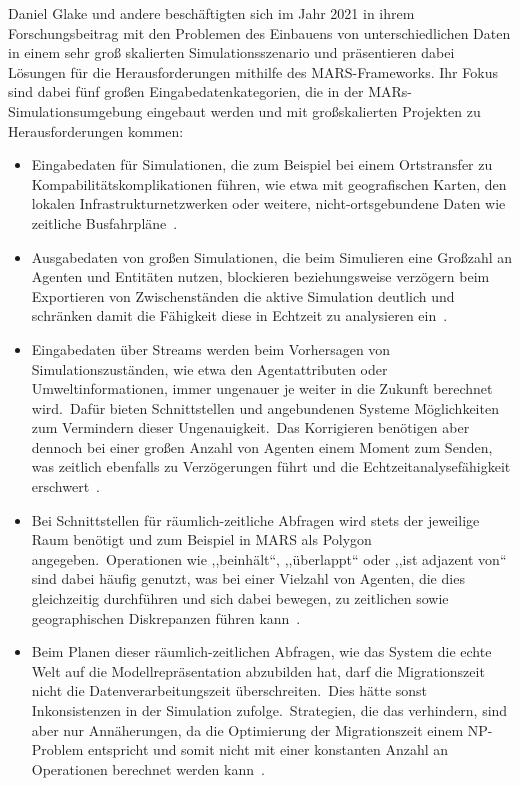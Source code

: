 Daniel Glake und andere beschäftigten sich im Jahr 2021 in ihrem Forschungsbeitrag mit den Problemen des Einbauens von unterschiedlichen Daten in einem sehr groß skalierten Simulationsszenario und präsentieren dabei Lösungen für die Herausforderungen mithilfe des MARS-Frameworks.
Ihr Fokus sind dabei fünf großen Eingabedatenkategorien, die in der MARs-Simulationsumgebung eingebaut werden und mit großskalierten Projekten zu Herausforderungen kommen:
\begin{itemize}
    \item Eingabedaten für Simulationen, die zum Beispiel bei einem Ortstransfer zu Kompabilitätskomplikationen führen, wie etwa mit geografischen Karten, den lokalen Infrastrukturnetzwerken oder weitere, nicht-ortsgebundene Daten wie zeitliche Busfahrpläne~\cite{Glake2021}.
    \item Ausgabedaten von großen Simulationen, die beim Simulieren eine Großzahl an Agenten und Entitäten nutzen, blockieren beziehungsweise verzögern beim Exportieren von Zwischenständen die aktive Simulation deutlich und schränken damit die Fähigkeit diese in Echtzeit zu analysieren ein~\cite{Glake2021}.
    \item Eingabedaten über Streams werden beim Vorhersagen von Simulationszuständen, wie etwa den Agentattributen oder Umweltinformationen, immer ungenauer je weiter in die Zukunft berechnet wird.~Dafür bieten Schnittstellen und angebundenen Systeme Möglichkeiten zum Vermindern dieser Ungenauigkeit.~Das Korrigieren benötigen aber dennoch bei einer großen Anzahl von Agenten einem Moment zum Senden, was zeitlich ebenfalls zu Verzögerungen führt und die Echtzeitanalysefähigkeit erschwert~\cite{Glake2021}.
    \item Bei Schnittstellen für räumlich-zeitliche Abfragen wird stets der jeweilige Raum benötigt und zum Beispiel in MARS als Polygon angegeben.~Operationen wie ,,beinhält``, ,,überlappt`` oder ,,ist adjazent von`` sind dabei häufig genutzt, was bei einer Vielzahl von Agenten, die dies gleichzeitig durchführen und sich dabei bewegen, zu zeitlichen sowie geographischen Diskrepanzen führen kann~\cite{Glake2021}.
    \item Beim Planen dieser räumlich-zeitlichen Abfragen, wie das System die echte Welt auf die Modellrepräsentation abzubilden hat, darf die Migrationszeit nicht die Datenverarbeitungszeit überschreiten.~Dies hätte sonst Inkonsistenzen in der Simulation zufolge.~Strategien, die das verhindern, sind aber nur Annäherungen, da die Optimierung der Migrationszeit einem NP-Problem entspricht und somit nicht mit einer konstanten Anzahl an Operationen berechnet werden kann~\cite{Glake2021}.
\end{itemize}

